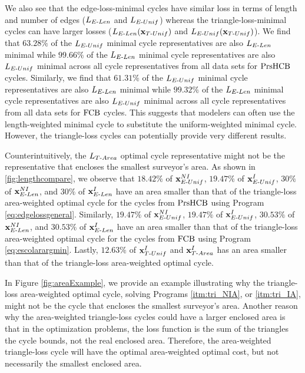 We also see that the edge-loss-minimal cycles have similar loss in terms of length and number of edges ($L_{E\text{-}Len}$ and $L_{E\text{-}Unif}$) whereas the triangle-loss-minimal cycles can have larger losses ($L_{E\text{-}Len}(\mathbf{x}_{T\text{-}Unif})$ and $L_{E\text{-}Unif}(\mathbf{x}_{T\text{-}Unif})$). We find that $63.28\%$ of the $L_{E\text{-}Unif}$ minimal cycle representatives are also $L_{E\text{-}Len}$ minimal while $99.66\%$ of the $L_{E\text{-}Len}$ minimal cycle representatives are also $L_{E\text{-}Unif}$ minimal across all cycle representatives from all data sets for $\mathrm{PrsHCB}$ cycles. Similarly, we find that $61.31\%$ of the $L_{E\text{-}Unif}$ minimal cycle representatives are also $L_{E\text{-}Len}$ minimal while $99.32\%$ of the $L_{E\text{-}Len}$ minimal cycle representatives are also $L_{E\text{-}Unif}$ minimal across all cycle representatives from all data sets for $\mathrm{FCB}$ cycles. This suggests that modelers can often use the length-weighted minimal cycle to substitute the uniform-weighted minimal cycle. However, the triangle-loss cycles can potentially provide very different results. 


Counterintuitively, the $L_{T\text{-}Area}$ optimal cycle representative might not be the representative that encloses the smallest surveyor's area. As shown in \fig\ref{fig:lengthcompare}, we observe that $18.42\%$ of $\mathbf{x}_{E\text{-}Unif}^{NI}$, $19.47\%$ of $\mathbf{x}_{E\text{-}Unif}^I$, $30\%$ of $\mathbf{x}_{E\text{-}Len}^{NI}$, and $30\%$ of  $\mathbf{x}_{E\text{-}Len}^I$ have an area smaller than that of the triangle-loss area-weighted optimal cycle for the cycles from $\mathrm{PrsHCB}$ using Program \eqref{eq:edgelossgeneral}. 
Similarly,  $19.47\%$ of $\mathbf{x}_{E\text{-}Unif}^{NI}$, $19.47\%$ of  $\mathbf{x}_{E\text{-}Unif}^I$, $30.53\%$ of $\mathbf{x}_{E\text{-}Len}^{NI}$, and $30.53\%$ of $\mathbf{x}_{E\text{-}Len}^I$ have an area smaller than that of the triangle-loss area-weighted optimal cycle for the cycles from $\mathrm{FCB}$ using Program \eqref{eq:escolarargmin}. Lastly, $12.63\%$ of $\mathbf{x}^{I}_{T\text{-}Unif}$ and $\mathbf{x}^{I}_{T\text{-}Area}$ has an area smaller than that of the triangle-loss area-weighted optimal cycle.  

In Figure \ref{fig:areaExample}, we provide an example illustrating why the triangle-loss area-weighted optimal cycle, solving Programs \ref{itm:tri_NIA}, or
\ref{itm:tri_IA}, might not be the cycle that encloses the smallest surveyor's area. Another reason why the area-weighted triangle-loss cycles could have a larger enclosed area is that in the optimization problems, the loss function is the sum of the triangles the cycle bounds, not the real enclosed area. Therefore, the area-weighted triangle-loss cycle will have the optimal area-weighted optimal cost, but not necessarily the smallest enclosed area. 

